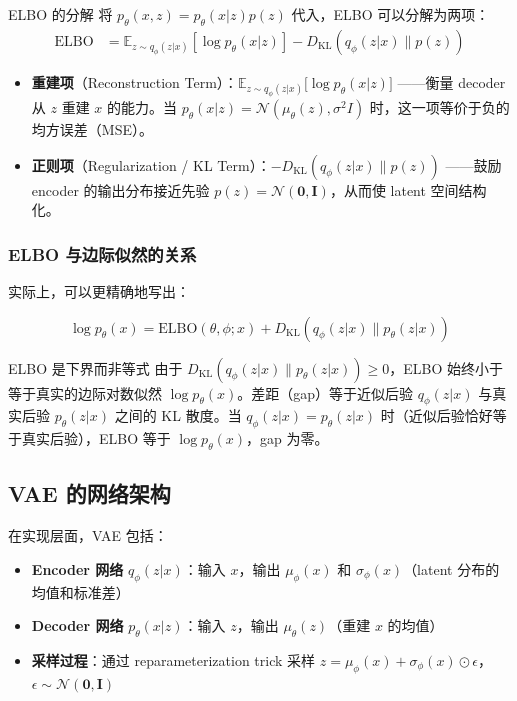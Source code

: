 \begin{importantbox}{ELBO 的分解}
将 $p_\theta(x, z) = p_\theta(x|z)p(z)$ 代入，ELBO 可以分解为两项：
\begin{align}
\text{ELBO} &= \mathbb{E}_{z \sim q_\phi(z|x)} \left[\log p_\theta(x|z)\right] - D_{\mathrm{KL}}(q_\phi(z|x) \| p(z)) \nonumber
\end{align}
\begin{itemize}
    \item \textbf{重建项}（Reconstruction Term）：$\mathbb{E}_{z \sim q_\phi(z|x)} {[}\log p_\theta(x|z){]}$ ——衡量 decoder 从 $z$ 重建 $x$ 的能力。当 $p_\theta(x|z) = \mathcal{N}(\mu_\theta(z), \sigma^2 I)$ 时，这一项等价于负的均方误差（MSE）。
    \item \textbf{正则项}（Regularization / KL Term）：$-D_{\mathrm{KL}}(q_\phi(z|x) \| p(z))$ ——鼓励 encoder 的输出分布接近先验 $p(z) = \mathcal{N}(\mathbf{0}, \mathbf{I})$，从而使 latent 空间结构化。
\end{itemize}
\end{importantbox}

\subsubsection{ELBO 与边际似然的关系}

实际上，可以更精确地写出：

$$\log p_\theta(x) = \text{ELBO}(\theta, \phi; x) + D_{\mathrm{KL}}(q_\phi(z|x) \| p_\theta(z|x))$$

\begin{warningbox}{ELBO 是下界而非等式}
由于 $D_{\mathrm{KL}}(q_\phi(z|x) \| p_\theta(z|x)) \geq 0$，ELBO 始终小于等于真实的边际对数似然 $\log p_\theta(x)$。差距（gap）等于近似后验 $q_\phi(z|x)$ 与真实后验 $p_\theta(z|x)$ 之间的 KL 散度。当 $q_\phi(z|x) = p_\theta(z|x)$ 时（近似后验恰好等于真实后验），ELBO 等于 $\log p_\theta(x)$，gap 为零。
\end{warningbox}

\subsection{VAE 的网络架构}

在实现层面，VAE 包括：

\begin{itemize}
    \item \textbf{Encoder 网络} $q_\phi(z|x)$：输入 $x$，输出 $\mu_\phi(x)$ 和 $\sigma_\phi(x)$（latent 分布的均值和标准差）
    \item \textbf{Decoder 网络} $p_\theta(x|z)$：输入 $z$，输出 $\mu_\theta(z)$（重建 $x$ 的均值）
    \item \textbf{采样过程}：通过 reparameterization trick 采样 $z = \mu_\phi(x) + \sigma_\phi(x) \odot \epsilon$，$\epsilon \sim \mathcal{N}(\mathbf{0}, \mathbf{I})$
\end{itemize}


